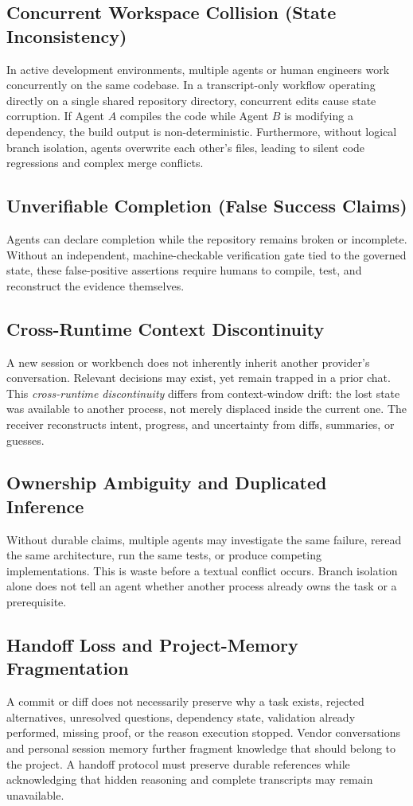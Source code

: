 \subsection{Concurrent Workspace Collision (State Inconsistency)}
In active development environments, multiple agents or human engineers work concurrently on the same codebase. In a transcript-only workflow operating directly on a single shared repository directory, concurrent edits cause state corruption. If Agent $A$ compiles the code while Agent $B$ is modifying a dependency, the build output is non-deterministic. Furthermore, without logical branch isolation, agents overwrite each other's files, leading to silent code regressions and complex merge conflicts.

\subsection{Unverifiable Completion (False Success Claims)}
Agents can declare completion while the repository remains broken or incomplete. Without an independent, machine-checkable verification gate tied to the governed state, these false-positive assertions require humans to compile, test, and reconstruct the evidence themselves.

\subsection{Cross-Runtime Context Discontinuity}
A new session or workbench does not inherently inherit another provider's conversation. Relevant decisions may exist, yet remain trapped in a prior chat. This \emph{cross-runtime discontinuity} differs from context-window drift: the lost state was available to another process, not merely displaced inside the current one. The receiver reconstructs intent, progress, and uncertainty from diffs, summaries, or guesses.

\subsection{Ownership Ambiguity and Duplicated Inference}
Without durable claims, multiple agents may investigate the same failure, reread the same architecture, run the same tests, or produce competing implementations. This is waste before a textual conflict occurs. Branch isolation alone does not tell an agent whether another process already owns the task or a prerequisite.

\subsection{Handoff Loss and Project-Memory Fragmentation}
A commit or diff does not necessarily preserve why a task exists, rejected alternatives, unresolved questions, dependency state, validation already performed, missing proof, or the reason execution stopped. Vendor conversations and personal session memory further fragment knowledge that should belong to the project. A handoff protocol must preserve durable references while acknowledging that hidden reasoning and complete transcripts may remain unavailable.

